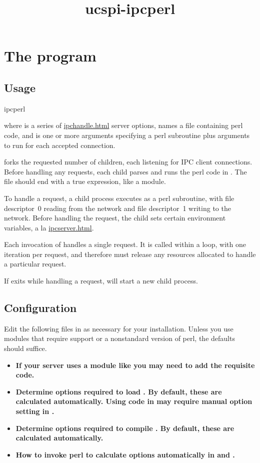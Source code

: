 \documentclass{book}
\title{ucspi-ipcperl}
\begin{document}
\section{The  program}

\subsection{Usage}
\begin{code}%
  ipcperl   
\end{code}
where  is a series of \href{ipchandle}{ipchandle.html} server
options,  names a file containing perl code, and 
is one or more arguments specifying a perl subroutine plus arguments to
run for each accepted connection.

 forks the requested number of children, each listening for
IPC client connections.  Before handling any requests, each child parses
and runs the perl code in .  The file should end with a true
expression, like a module.

To handle a request, a child process executes  as a perl
subroutine, with file descriptor~0 reading from the network and file
descriptor~1 writing to the network.  Before handling the request, the
child sets certain environment variables, a la
\href{\cmd{ipcserver}}{ipcserver.html}.

Each invocation of  handles a single request.  It is called
within a loop, with one iteration per request, and therefore must
release any resources allocated to handle a particular request.

If  exits while handling a request,  will
start a new child process.


\subsection{Configuration}
Edit the following files in  as necessary for your
installation.  Unless you use modules that require  support or a
nonstandard version of perl, the defaults should suffice.
\begin{itemize}
\item\bf{}
  If your server uses a module like  you may need to add the
  requisite  code.

\item\bf{}
  Determine options required to load .  By default,
  these are calculated automatically.  Using  code in
   may require manual option setting in
  .

\item\bf{}
  Determine options required to compile .  By default,
  these are calculated automatically.

\item\bf{}
  How to invoke perl to calculate options automatically in
   and .
\end{itemize}
\end{document}
